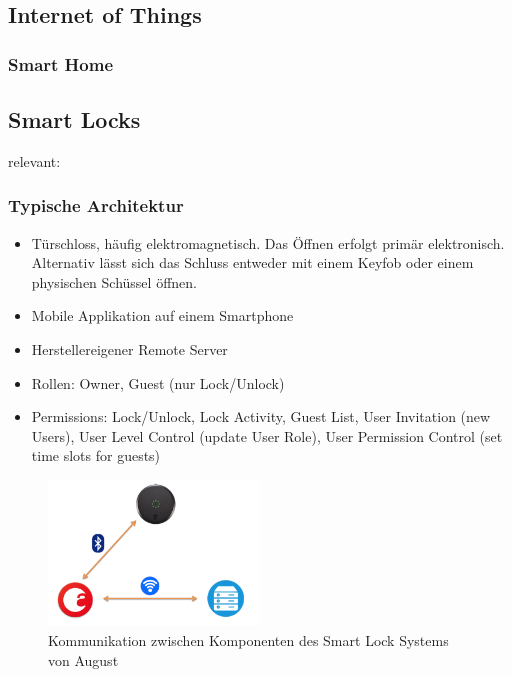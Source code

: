 \subsection{Internet of Things}
\label{sec:iot}
\subsubsection{Smart Home}
\label{sec:smart_home}

\subsection{Smart Locks}
\label{sec:smart_locks}

	relevant: \cite{Ye2017}\cite{Fuller2017}\cite{Rose2016}\cite{Ho2016}
	
	\subsubsection{Typische Architektur}
		\begin{itemize}
			\item Türschloss, häufig elektromagnetisch. Das Öffnen erfolgt primär elektronisch. Alternativ lässt sich das Schluss entweder mit einem Keyfob oder einem physischen Schüssel öffnen.
			\item Mobile Applikation auf einem Smartphone
			\item Herstellereigener Remote Server
		\end{itemize}
		\begin{itemize}
			\item Rollen: Owner, Guest (nur Lock/Unlock)
			\item Permissions: Lock/Unlock, Lock Activity, Guest List, User Invitation (new Users), User Level Control (update User Role), User Permission Control (set time slots for guests)
		\end{itemize}
	
		\begin{figure}[H]
			\centering
			\includegraphics[width=0.5\textwidth]{paperNotes/ye2017_august}
			\caption{Kommunikation zwischen Komponenten des Smart Lock Systems von August}
			\label{fig:august}
		\end{figure}
